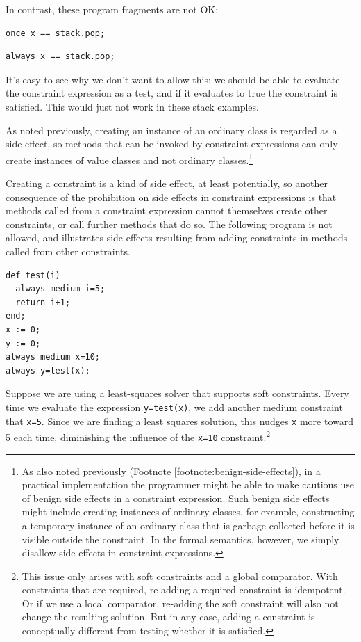 \documentclass{article}
\begin{document}
In contrast, these program fragments are not OK:
\begin{verbatim}
once x == stack.pop;
\end{verbatim}

\begin{verbatim}
always x == stack.pop;
\end{verbatim}

It's easy to see why we don't want to allow this: we should be able to
evaluate the constraint expression as a test, and if it evaluates to
true the constraint is satisfied.  This would just not work in these
stack examples.

As noted previously, creating an instance of an ordinary class is
regarded as a side effect, so methods that can be invoked by
constraint expressions can only create instances of value classes and
not ordinary classes.\footnote{As also noted previously (Footnote
  \ref{footnote:benign-side-effects}), in a practical implementation
  the programmer might be able to make cautious use of benign side effects
  in a constraint expression.  Such benign side effects might include
  creating instances of ordinary classes, for example, constructing a
  temporary instance of an ordinary class that is garbage collected
  before it is visible outside the constraint.  In the formal
  semantics, however, we simply disallow side effects in constraint
  expressions.}

Creating a constraint is a kind of side effect, at least potentially,
so another consequence of the prohibition on side effects in
constraint expressions is that methods called from a constraint
expression cannot themselves create other constraints, or call further
methods that do so.  The following program is not allowed, and
illustrates side effects resulting from adding constraints in methods
called from other constraints.

\begin{verbatim}
def test(i)
  always medium i=5;
  return i+1;
end;
x := 0;
y := 0;
always medium x=10;
always y=test(x);
\end{verbatim}

Suppose we are using a least-squares solver that supports soft
constraints.  Every time we evaluate the expression \verb|y=test(x)|,
we add another medium constraint that \verb|x=5|.  Since we are
finding a least squares solution, this nudges \verb|x| more toward 5
each time, diminishing the influence of the \verb|x=10|
constraint.\footnote{This issue only arises with soft constraints and
  a global comparator.  With constraints that are required, re-adding
  a required constraint is idempotent.  Or if we use a local
  comparator, re-adding the soft constraint will also not change the
  resulting solution.  But in any case, adding a constraint is
  conceptually different from testing whether it is satisfied.}
\end{document}
